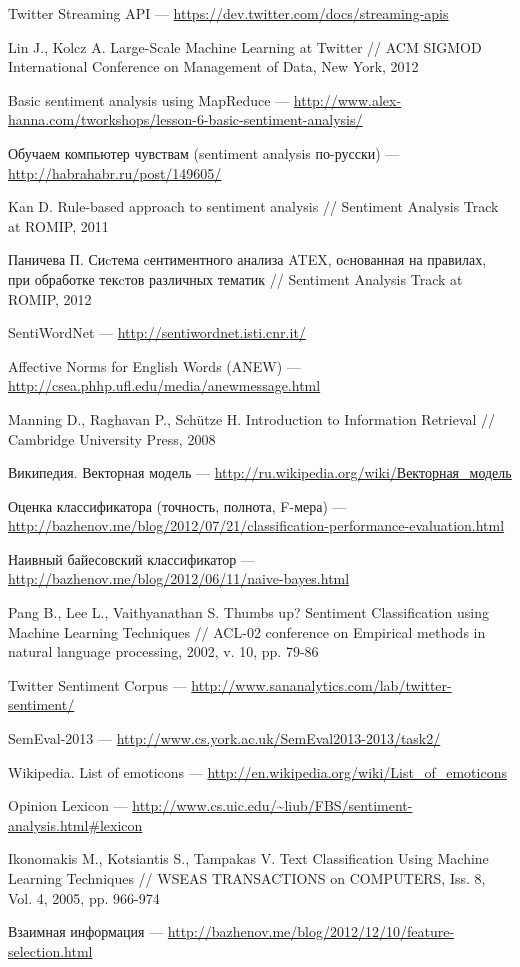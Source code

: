 Twitter Streaming API --- \url{https://dev.twitter.com/docs/streaming-apis}

Lin J., Kolcz A. Large-Scale Machine Learning at Twitter // ACM SIGMOD International Conference on Management of Data, New York, 2012

Basic sentiment analysis using MapReduce --- \url{http://www.alex-hanna.com/tworkshops/lesson-6-basic-sentiment-analysis/}

Обучаем компьютер чувствам (sentiment analysis по-русски) --- \url{http://habrahabr.ru/post/149605/}

Kan D. Rule-based approach to sentiment analysis // Sentiment Analysis Track at ROMIP, 2011

Паничева П. Сиcтема cентиментного анализа ATEX, оcнованная
на правилах, при обработке текcтов различных тематик // Sentiment Analysis Track at ROMIP, 2012

SentiWordNet --- \url{http://sentiwordnet.isti.cnr.it/}

Affective Norms for English Words (ANEW) --- \url{http://csea.phhp.ufl.edu/media/anewmessage.html}

Manning D., Raghavan P., Schütze H. Introduction to Information Retrieval // Cambridge University Press, 2008

Википедия. Векторная модель --- \href{http://ru.wikipedia.org/wiki/%D0%92%D0%B5%D0%BA%D1%82%D0%BE%D1%80%D0%BD%D0%B0%D1%8F_%D0%BC%D0%BE%D0%B4%D0%B5%D0%BB%D1%8C}{http://ru.wikipedia.org/wiki/Векторная\_модель}

Оценка классификатора (точность, полнота, F-мера) --- \url{http://bazhenov.me/blog/2012/07/21/classification-performance-evaluation.html}

Наивный байесовский классификатор --- \url{http://bazhenov.me/blog/2012/06/11/naive-bayes.html}

Pang B., Lee L., Vaithyanathan S. Thumbs up? Sentiment Classification using Machine Learning Techniques // ACL-02 conference on Empirical methods in natural language processing, 2002, v. 10, pp. 79-86

Twitter Sentiment Corpus --- \url{http://www.sananalytics.com/lab/twitter-sentiment/}

SemEval-2013 --- \url{http://www.cs.york.ac.uk/SemEval2013-2013/task2/}

Wikipedia. List of emoticons --- \url{http://en.wikipedia.org/wiki/List_of_emoticons}

Opinion Lexicon --- \url{http://www.cs.uic.edu/~liub/FBS/sentiment-analysis.html#lexicon}

Ikonomakis M., Kotsiantis S., Tampakas V. Text Classification Using Machine Learning Techniques // WSEAS TRANSACTIONS on COMPUTERS, Iss. 8, Vol. 4, 2005, pp. 966-974

Взаимная информация --- \url{http://bazhenov.me/blog/2012/12/10/feature-selection.html}